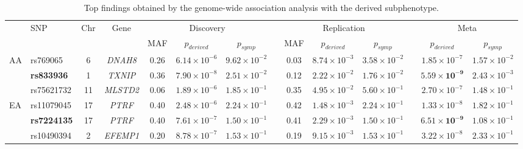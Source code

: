 \documentclass[10pt,letterpaper]{article}
\begin{document}
\begin{table}[t]
\begin{adjustwidth}{-2.25in}{0in} %
	\caption{Top findings obtained by the genome-wide association analysis with the derived subphenotype.}
	\label{tbl:association_coc}
	\vskip 0.15in
	\begin{center}
		\begin{scriptsize}
			\setlength{\tabcolsep}{2pt}
			\begin{tabular}{llcccccccccccc}
				\toprule
				\multirow{2}{*}{} & \multirow{2}{*}{SNP} & \multirow{2}{*}{Chr} &   \multirow{2}{*}{Gene} & \multicolumn{3}{c}{Discovery}  & \phantom{a} & \multicolumn{3}{c}{Replication} & \phantom{a} &  \multicolumn{2}{c}{Meta} \\
				\cmidrule{5-7} \cmidrule{9-11} \cmidrule{13-14}
				&            &          &      & MAF  & $p_{derived}$        & $p_{symp}$      &     & MAF  & $p_{derived}$        & $p_{symp}$      &     & $p_{derived}$        & $p_{symp}$            \\
				\midrule
				\multirow{3}{*}{AA}    &  rs769065    & 6  &  \textit{DNAH8}  & 0.26 & $6.14\times 10^{-6}$ & $9.62\times 10^{-2}$ && 0.03 & $8.74\times 10^{-3}$ & $3.58\times 10^{-2}$ && $1.85\times 10^{-7}$ & $1.57\times 10^{-2}$ \\
				& {\bf rs833936}& 1   &  \textit{TXNIP}  & 0.36 & $7.90\times 10^{-8}$ & $2.51\times 10^{-2}$ && 0.12 & $2.22\times 10^{-2}$ & $1.76\times 10^{-2}$ && $\mathbf{5.59\times 10^{-9}}$& $2.43\times 10^{-3}$ \\
				& rs75621732     & 11  &  \textit{MLSTD2} & 0.06 & $1.89\times 10^{-6}$ & $1.85\times 10^{-1}$ && 0.35 & $4.95\times 10^{-2}$ & $5.60\times 10^{-1}$ && $2.70\times 10^{-7}$ & $1.48\times 10^{-1}$ \\
				\midrule
				\multirow{4}{*}{EA}&{rs11079045}    & 17  &  \textit{PTRF}& 0.40 & $2.48\times 10^{-6}$ & $2.24\times 10^{-1}$ && 0.42 & $1.48\times 10^{-3}$ & $2.24\times 10^{-1}$ && $1.33\times 10^{-8}$ & $1.82\times 10^{-1}$ \\
				& {\bf rs7224135}     & 17  &  \textit{PTRF}& 0.40 & $7.61\times 10^{-7}$ & $1.50\times 10^{-1}$ && 0.41 & $2.29\times 10^{-3}$ & $1.50\times 10^{-1}$ && $\mathbf{6.51\times 10^{-9}}$ & $1.08\times 10^{-1}$ \\
				& {rs10490394}    & 2   &  \textit{EFEMP1}& 0.20 & $8.78\times 10^{-7}$ & $1.53\times 10^{-1}$ && 0.19 & $9.15\times 10^{-3}$ & $1.53\times 10^{-1}$ &&$3.22\times 10^{-8}$& $2.33\times 10^{-1}$ \\

\end{tabular}
\end{scriptsize}
\end{center}
\end{adjustwidth}
\end{table}
\end{document}
